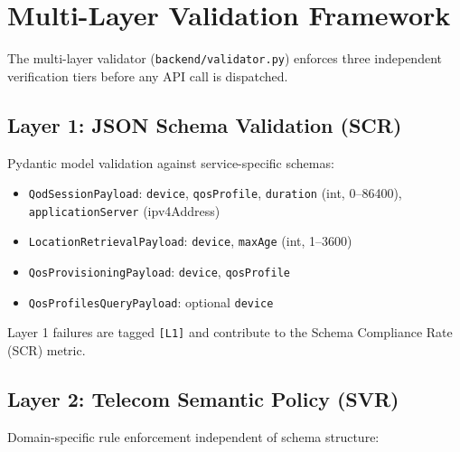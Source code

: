 \documentclass[conference]{IEEEtran}
\begin{document}
\section{Multi-Layer Validation Framework}
\label{sec:validation}

The multi-layer validator (\texttt{backend/validator.py}) enforces three
independent verification tiers before any API call is dispatched.

\subsection{Layer 1: JSON Schema Validation (SCR)}

Pydantic model validation against service-specific schemas:

\begin{itemize}[leftmargin=1.2em]
  \item \texttt{QodSessionPayload}: \texttt{device}, \texttt{qosProfile},
        \texttt{duration} (int, 0–86400), \texttt{applicationServer} (ipv4Address)
  \item \texttt{LocationRetrievalPayload}: \texttt{device},
        \texttt{maxAge} (int, 1–3600)
  \item \texttt{QosProvisioningPayload}: \texttt{device}, \texttt{qosProfile}
  \item \texttt{QosProfilesQueryPayload}: optional \texttt{device}
\end{itemize}

Layer 1 failures are tagged \texttt{[L1]} and contribute to the
Schema Compliance Rate (SCR) metric.

\subsection{Layer 2: Telecom Semantic Policy (SVR)}

Domain-specific rule enforcement independent of schema structure:
\end{document}
